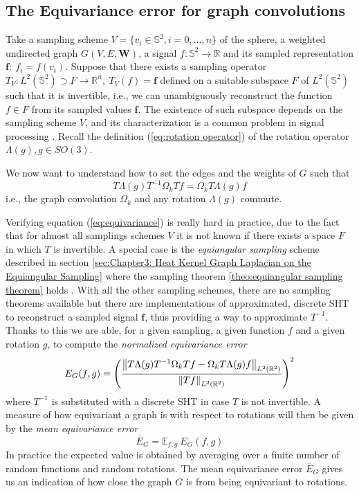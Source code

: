 \subsection{The Equivariance error for graph convolutions}
Take a sampling scheme $V=\{v_i\in\mathbb S^2, i=0, ..., n\}$ of the sphere, a weighted undirected graph $G(V, E, \mathbf W)$, a signal $f: \mathbb S^2\to\mathbb R$ and its sampled representation $\mathbf f:\ f_i=f(v_i)$. Suppose that there exists a sampling operator $T_V: L^2(\mathbb S^2) \supset F\to \mathbb R^n,\  T_V(f) = \mathbf f$ defined on a suitable subspace $F$ of $L^2(\mathbb S^2)$ such that it is invertible, i.e., we can unambiguously reconstruct the function $f\in F$ from its sampled values $\mathbf f$. The existence of such subspace depends on the sampling scheme $V$, and its characterization is a common problem in signal processing \cite{Driscoll:1994:CFT:184069.184073}. Recall the definition (\ref{eq:rotation operator}) of the rotation operator $\Lambda(g), g\in SO(3)$. 

We now want to understand how to set the edges and the weights of $G$ such that
\begin{equation}\label{eq:equivariance}
T \Lambda(g) T^{-1} \Omega_k T f = \Omega_k T \Lambda(g) f
\end{equation}
i.e., the graph convolution $\Omega_k$ and any rotation $\Lambda(g)$ commute.

Verifying equation (\ref{eq:equivariance}) is really hard in practice, due to the fact that for almost all samplings schemes $V$ it is not known if there exists a space $F$ in which $T$ is invertible. A special case is the \textit{equiangular sampling} scheme described in section \ref{sec:Chapter3: Heat Kernel Graph Laplacian on the Equiangular Sampling} where the sampling theorem \ref{theo:equiangular sampling theorem} holds \cite{Driscoll:1994:CFT:184069.184073}. With all the other sampling schemes, there are no sampling theorems available but there are implementations of approximated, discrete SHT to reconstruct a sampled signal $\mathbf f$, thus providing a way to approximate $T^{-1}$. Thanks to this we are able, for a given sampling, a given function $f$ and a given rotation $g$, to compute the \textit{normalized equivariance error} 
\begin{equation}\label{eq:equivariance error}
E_{G}(f, g) = \left(\frac{ \left\lVert T \Lambda(g) T^{-1} \Omega_k Tf - \Omega_k T \Lambda(g) f\right\rVert_{L^2(\mathbb R^2)}}{\left\lVert Tf\right\rVert_{L^2(\mathbb R^2)}}\right)^2
\end{equation}
where $T^{-1}$ is substituted with a discrete SHT in case $T$ is not invertible.
A measure of how equivariant a graph is with respect to rotations will then be given by the \textit{mean equivariance error}
\begin{equation}\label{eq:mean equivariance error}
\overline E_G = \mathbb E_{f, g}\ 	E_G(f, g) 
\end{equation}
In practice the expected value is obtained by averaging over a finite number of random functions and random rotations. The mean equivariance error $\overline E_G$ gives us an indication of how close the graph $G$ is from being equivariant to rotations.

